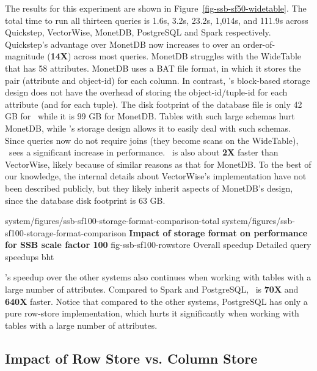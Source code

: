 The results for this experiment are shown in Figure~\ref{fig-ssb-sf50-widetable}. The total time to run all thirteen queries is 1.6s, 3.2s, 	23.2s, 1,014s, and	111.9s across Quickstep, VectorWise, MonetDB, PostgreSQL and Spark respectively. Quickstep's  advantage over MonetDB now increases to over an order-of-magnitude (\textbf{14X}) across most queries.
MonetDB struggles with the WideTable that has 58 attributes. MonetDB uses a BAT file format, in which it stores the pair (attribute and object-id) for each column. In contrast, \Quickstep's block-based storage design does not have the overhead of storing the object-id/tuple-id for each attribute (and for each tuple). The disk footprint of the database file is only 42 GB for \Quickstep\ while it is 99 GB for MonetDB. Tables with such large schemas hurt MonetDB, while \Quickstep's storage design allows it to easily deal with such schemas. Since queries now do not require joins (they become scans on the WideTable), \Quickstep\ sees a significant increase in performance.
\Quickstep\ is also about \textbf{2X} faster than VectorWise, likely because of similar reasons as that for MonetDB. To the best of our knowledge, the internal details about VectorWise's implementation have not been described publicly, but they likely inherit aspects of MonetDB's design, since the database disk footprint is 63 GB.

\twoabfigures
{system/figures/ssb-sf100-storage-format-comparison-total}
{system/figures/ssb-sf100-storage-format-comparison}
{\textbf{Impact of storage format on performance for SSB scale factor 100}}
{fig-ssb-sf100-rowstore}
{Overall speedup}
{Detailed query speedups}
{bht}

\Quickstep's speedup over the other systems also continues when working with tables with a large number of attributes. Compared to Spark and PostgreSQL, \Quickstep\ is \textbf{70X} and \textbf{640X} faster. Notice that compared to the other systems, PostgreSQL has only a pure row-store implementation, which hurts it significantly when working with tables with a large number of attributes.

\subsection{Impact of Row Store vs. Column Store}
\label{sec:expt:rs-vs-cs}

